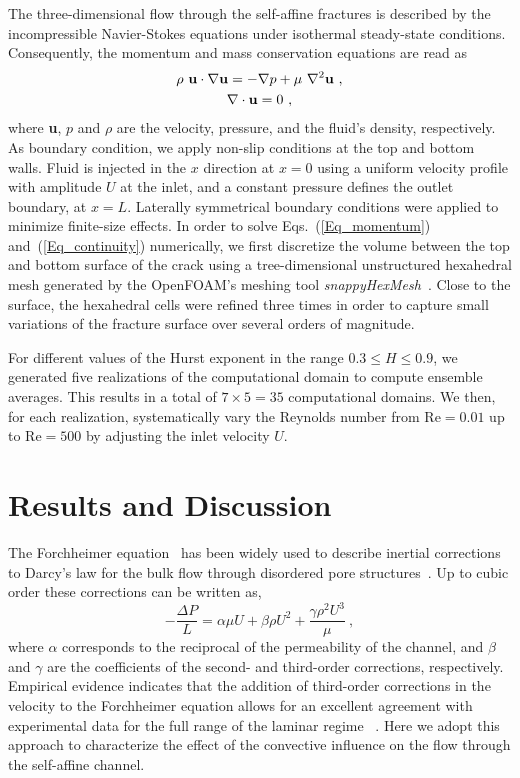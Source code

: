 \documentclass[aps,pre,
superscriptaddress,
twocolumn,
notitlepage,
10pt,
]{revtex4-1}
\begin{document}
The three-dimensional flow through the self-affine fractures is described by the
incompressible Navier-Stokes equations under isothermal steady-state conditions.
Consequently, the momentum and mass conservation equations are read as
%
\begin{gather} 
\rho~\mathbf{u\cdot\nabla u} = -\mathbf{\nabla} p +
\mu~\mathbf{ \nabla }^{2} \mathbf{u}~, \label{Eq_momentum} \\
{\bf{\nabla\cdot u}}=0~, \label{Eq_continuity}
\end{gather} %
where {\bf u}, $p$ and  $\rho$ are the velocity, pressure, and the fluid's
density, respectively. As boundary condition, we apply non-slip conditions at
the top and bottom walls. Fluid is injected in the $x$ direction at $x=0$ using
a uniform velocity profile with amplitude $U$ at the inlet, and a constant
pressure defines the outlet boundary, at $x=L$. Laterally symmetrical boundary
conditions were applied to minimize finite-size effects. In order to solve
Eqs.~(\ref{Eq_momentum}) and~(\ref{Eq_continuity}) numerically, we first
discretize the volume between the top and bottom surface of the crack using a
tree-dimensional unstructured hexahedral mesh generated by the OpenFOAM's
meshing tool \emph{snappyHexMesh}~\cite{OF_Weller1998}. Close to the surface,
the hexahedral cells were refined three times in order to capture small
variations of the fracture surface over several orders of magnitude.

For different values of the Hurst exponent in the range $0.3 \le H \le 0.9$, we
generated five realizations of the computational domain to compute ensemble
averages. This results in a total of $7\times 5=35$ computational domains. We
then, for each realization, systematically vary the Reynolds number from
$\mathrm{Re}=0.01$ up to $\mathrm{Re}=500$ by adjusting the inlet velocity $U$.

\section{Results and Discussion}\label{sec:results}

The Forchheimer equation~\cite{Forchheimer1901, Whitaker1996} has been widely
used to describe inertial corrections to Darcy's law for the bulk flow through
disordered pore structures~\cite{Sahimi2000,Sahimi2011,Dullien1992}. Up to cubic
order these corrections can be written as,
%
\begin{equation} 
-\frac{\Delta P}{L} = \alpha \mu U + \beta \rho {U^2} + \frac{\gamma \rho^{2}
	U^{3}}{\mu}~, 
\label{Eq_cubic} 
\end{equation}
%
where $\alpha$ corresponds to the reciprocal of the permeability of the
channel, and $\beta$  and $\gamma$  are the coefficients of the second- and
third-order corrections, respectively. Empirical evidence indicates that
the addition of third-order corrections in the velocity to the Forchheimer
equation allows for an excellent agreement with experimental data for the
full range of the laminar regime ~\cite{Sahimi1994, Edwards1990,
	Andrade1999, Hill2001}. Here  we adopt this approach to characterize the
effect of the convective influence on the flow through the self-affine
channel. 
\end{document}
